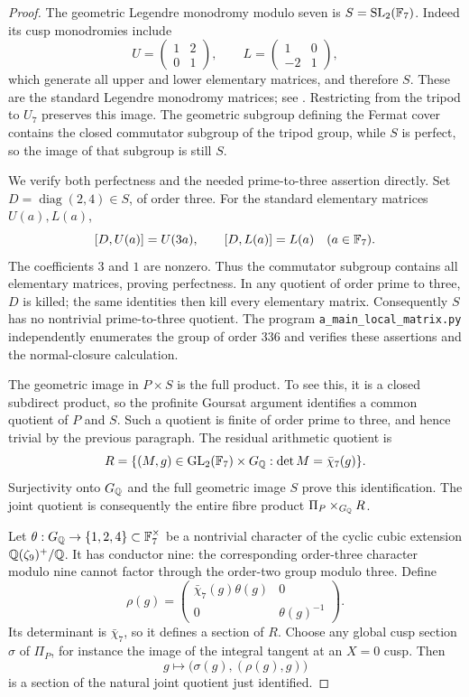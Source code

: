 \begin{proof}
The geometric Legendre monodromy modulo seven is
$S=\mathrm{SL}_2(\mathbb F_7)$. Indeed its cusp monodromies include
\[
 U=\begin{pmatrix}1&2\\0&1\end{pmatrix},\qquad
 L=\begin{pmatrix}1&0\\-2&1\end{pmatrix},
\]
which generate all upper and lower elementary matrices, and therefore
$S$. These are the standard Legendre monodromy matrices; see
\citet[\S5]{AMStixBirational2014}. Restricting from the tripod to
$U_7$ preserves this image. The geometric subgroup defining the Fermat
cover contains the closed commutator subgroup of the tripod group,
while $S$ is perfect, so the image of that subgroup is still $S$.

We verify both perfectness and the needed prime-to-three assertion
directly. Set $D=\operatorname{diag}(2,4)\in S$, of order three.
For the standard elementary matrices $U(a),L(a)$,
\[
 [D,U(a)]=U(3a),\qquad [D,L(a)]=L(a)
 \quad(a\in\mathbb F_7).
\]
The coefficients $3$ and $1$ are nonzero. Thus the commutator subgroup
contains all elementary matrices, proving perfectness. In any quotient
of order prime to three, $D$ is killed; the same identities then kill
every elementary matrix. Consequently $S$ has no nontrivial
prime-to-three quotient. The program
\texttt{a\_main\_local\_matrix.py} independently enumerates the group
of order 336 and verifies these assertions and the normal-closure
calculation.

The geometric image in $P\times S$ is the full product. To see this,
it is a closed subdirect product, so the profinite Goursat argument
identifies a common quotient of $P$ and $S$. Such a quotient is finite
of order prime to three, and hence trivial by the previous paragraph.
The residual arithmetic quotient is
\[
 R=\{(M,g)\in\mathrm{GL}_2(\mathbb F_7)\times G_\mathbb Q:
                  \det M=\bar\chi_7(g)\}.
\]
Surjectivity onto $G_\mathbb Q$ and the full geometric image $S$ prove this
identification. The joint quotient is consequently the entire fibre
product $\Pi_P\times_{G_\mathbb Q}R$.

Let $\theta:G_\mathbb Q\to\{1,2,4\}\subset\mathbb F_7^\times$ be a nontrivial
character of the cyclic cubic extension $\mathbb Q(\zeta_9)^+/\mathbb Q$.
It has conductor nine: the corresponding order-three character modulo
nine cannot factor through the order-two group modulo three.
Define
\[
 \rho(g)=
 \begin{pmatrix}
 \bar\chi_7(g)\theta(g)&0\\
 0&\theta(g)^{-1}
 \end{pmatrix}.
\]
Its determinant is $\bar\chi_7$, so it defines a section of $R$.
Choose any global cusp section $\sigma$ of $\Pi_P$, for instance the
image of the integral tangent at an $X=0$ cusp. Then
\[
 g\longmapsto\bigl(\sigma(g),(\rho(g),g)\bigr)
\]
is a section of the natural joint quotient just identified.


\end{proof}
